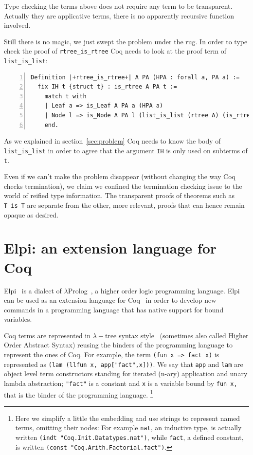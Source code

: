 \documentclass[a4paper,UKenglish,cleveref, autoref]{lipics-v2019}
\begin{document}
Type checking the terms above does not require any term to be
transparent. Actually they are applicative terms, there is no
apparently recursive function involved.

Still there is no magic, we just swept the problem under the rug.
In order to type check the proof
of \lstinline+rtree_is_rtree+ Coq needs to look at the
proof term of \lstinline+list_is_list+:

\begin{lstlisting}[numbers=left]
Definition |+rtree_is_rtree+| A PA (HPA : forall a, PA a) :=
  fix IH t {struct t} : is_rtree A PA t :=
    match t with
    | Leaf a => is_Leaf A PA a (HPA a)
    | Node l => is_Node A PA l (list_is_list (rtree A) (is_rtree A) IH l)
    end.
\end{lstlisting}

\noindent
As we explained in section~\ref{sec:problem} Coq needs to know the
body of  \lstinline+list_is_list+ in order to agree that the argument
\lstinline+IH+ is only used on subterms of \lstinline+t+.

Even if we can't make the problem disappear (without changing the way Coq
checks termination), we claim we confined the termination checking issue
to the world of reified type information. The transparent proofs of
theorems such as \lstinline+T_is_T+ are separate from the other, more
relevant, proofs that can hence remain opaque as desired.

\section{Elpi: an extension language for Coq} %
\label{sec:elpilang}

Elpi~\cite{dunchev:hal-01176856} is a dialect of
$\lambda$Prolog~\cite{miller_nadathur_2012}, a higher order logic
programming language. Elpi can be used as an extension language for
Coq~\cite{tassi:hal-01637063} in order to develop new commands in a programming
language that has native support for bound variables.

Coq terms are represented in $\lambda-$tree syntax
style~\cite{10.1007/3-540-44957-4_16} (sometimes also called
Higher Order Abstract Syntax) reusing the binders of the programming
language to represent the ones of Coq.
For example, the
term \lstinline+(fun x => fact x)+ is represented as
\lstinline+(lam (llfun x, app["fact",x]))+. 
We say that \lstinline+app+ and \lstinline+lam+ are object level term
constructors standing for iterated (n-ary) application and unary lambda
abstraction; \lstinline+"fact"+ is a constant and \lstinline+x+ is a
variable bound by \lstinline+fun x,+ that is the binder
of the programming language.  \footnote{Here we simplify
a little the embedding and use strings to represent named terms,
omitting their nodes:
For example \lstinline+nat+,
an inductive type,
is actually written \lstinline+(indt "Coq.Init.Datatypes.nat")+,
while \lstinline+fact+, a defined constant,
is written \lstinline+(const "Coq.Arith.Factorial.fact")+.}
\end{document}
